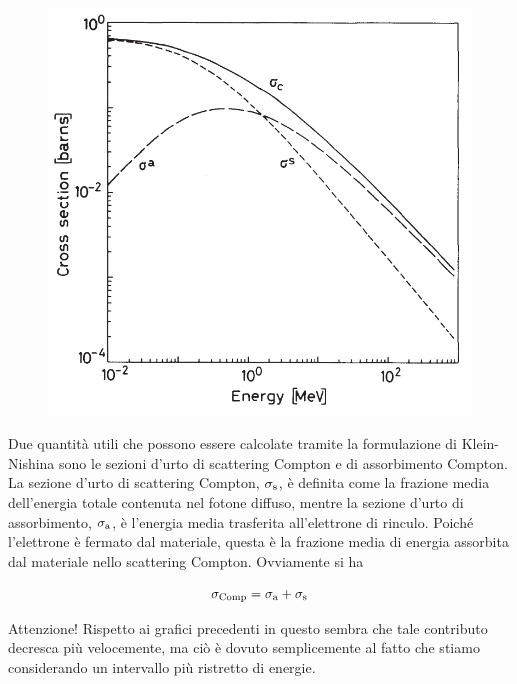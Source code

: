 \begin{minipage}{0.375\textwidth}
    \begin{figure}[H]
        \centering
        \includegraphics[width=\textwidth]{immagini/sezione_durto_effetto_Compton.png}
    \end{figure}
\end{minipage}
\begin{minipage}{0.62\textwidth}
    Due quantità utili che possono essere calcolate tramite la formulazione di Klein-Nishina sono le sezioni d'urto di scattering Compton e di assorbimento Compton. La sezione d'urto di scattering Compton, $\sigma_{\rm s}$, è definita come la frazione media dell'energia totale contenuta nel fotone diffuso, mentre la sezione d'urto di assorbimento, $\sigma_{\rm a}$, è l'energia media trasferita all'elettrone di rinculo. Poiché l'elettrone è fermato dal materiale, questa è la frazione media di energia assorbita dal materiale nello scattering Compton. Ovviamente si ha
\end{minipage}

\begin{equation*}
    \sigma_{\rm Comp}=\sigma_{\rm a} + \sigma_{\rm s}
\end{equation*}

Attenzione! Rispetto ai grafici precedenti in questo sembra che tale contributo decresca più velocemente, ma ciò è dovuto semplicemente al fatto che stiamo considerando un intervallo più ristretto di energie.


